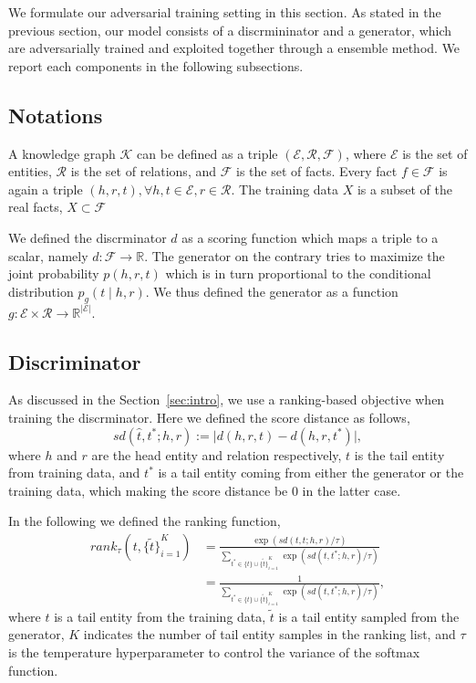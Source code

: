 \documentclass[twocolumn,a4paper,10pt,review,5p]{elsarticle}
\begin{document}
We formulate our adversarial training setting in this section. As stated in the previous section, our model consists of a discrmininator and a generator, which are adversarially trained and exploited together through a ensemble method. We report each components in the following subsections.

\subsection{Notations}

A knowledge graph $\mathcal{K}$ can be defined as a triple $(\mathcal{E}, \mathcal{R}, \mathcal{F})$, where $\mathcal{E}$ is the set of entities, $\mathcal{R}$ is the set of relations, and $\mathcal{F}$ is the set of facts. Every fact $f\in \mathcal{F}$ is again a triple $(h, r, t), \forall h,t\in\mathcal{E}, r\in\mathcal{R}$. The training data $X$ is a subset of the real facts, $X \subset \mathcal{F}$

We defined the discrminator $d$ as a scoring function which maps a triple to a scalar, namely $d: \mathcal{F}\rightarrow \mathbb{R}$. The generator on the contrary tries to maximize the joint probability $p(h, r, t)$ which is in turn proportional to the conditional distribution $p_g(t \mid h, r)$. We thus defined the generator as a function $g: \mathcal{E} \times \mathcal{R} \rightarrow \mathbb{R}^{\lvert \mathcal{E} \rvert}$.

\subsection{Discriminator}

As discussed in the Section~\ref{sec:intro}, we use a ranking-based objective when training the discrminator. Here we defined the score distance as follows,
\[
    sd(\hat t, t^*; h, r) := \lvert d(h, r, t) - d(h, r, t^*) \rvert,
\]
where $h$ and $r$ are the head entity and relation respectively, $t$ is the tail entity from training data, and $t^*$ is a tail entity coming from either the generator or the training data, which making the score distance be 0 in the latter case.

In the following we defined the ranking function,
\begin{align*}
    rank_\tau(t, {\{\tilde t \}}_{i=1}^K)
    &= \frac{\exp(sd(t, t; h, r) / \tau)}
        {\sum_{t^*\in \{t\} \cup {\{\tilde t \}}_{i=1}^K } \exp (sd(t, t^*; h, r) / \tau) } \\
    &= \frac{1}
        {\sum_{t^*\in \{t\} \cup {\{\tilde t \}}_{i=1}^K } \exp (sd(t, t^*; h, r) / \tau) },
\end{align*}
where $t$ is a tail entity from the training data, $\tilde t$ is a tail entity sampled from the generator, $K$ indicates the number of tail entity samples in the ranking list, and $\tau$ is the temperature hyperparameter to control the variance of the softmax function.
\end{document}
